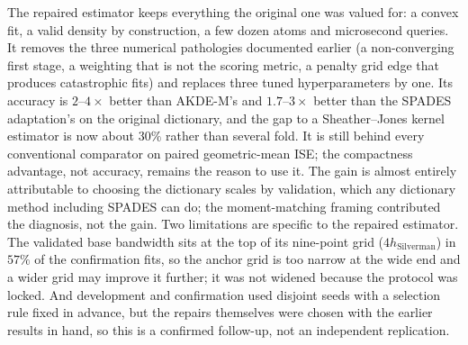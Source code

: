 The repaired estimator keeps everything the original one was valued for: a
convex fit, a valid density by construction, a few dozen atoms and
microsecond queries. It removes the three numerical pathologies documented
earlier (a non-converging first stage, a weighting that is not the scoring
metric, a penalty grid edge that produces catastrophic fits) and replaces
three tuned hyperparameters by one. Its accuracy is $2$--$4\times$ better than
AKDE-M's and $1.7$--$3\times$ better than the SPADES adaptation's on the
original dictionary, and the gap to a Sheather--Jones kernel estimator is now
about $30\%$ rather than several fold. It is still behind every conventional
comparator on paired geometric-mean ISE; the compactness advantage, not
accuracy, remains the reason to use it. The gain is almost entirely
attributable to choosing the dictionary scales by validation, which any
dictionary method including SPADES can do; the moment-matching framing
contributed the diagnosis, not the gain. Two limitations are specific to the repaired estimator. The validated base
bandwidth sits at the top of its nine-point grid ($4h_{\mathrm{Silverman}}$)
in $57\%$ of the confirmation fits, so the anchor grid is too narrow at the
wide end and a wider grid may improve it further; it was not widened because
the protocol was locked. And development and confirmation used disjoint
seeds with a selection rule fixed in advance, but the repairs themselves were
chosen with the earlier results in hand, so this is a confirmed follow-up,
not an independent replication.
